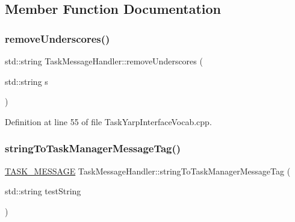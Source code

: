 \subsection{Member Function Documentation}
\hypertarget{classocra_1_1TaskMessageHandler_a688cdf189678986d158a1bc72ed84d2c}{}\label{classocra_1_1TaskMessageHandler_a688cdf189678986d158a1bc72ed84d2c} 
\subsubsection{\texorpdfstring{remove\+Underscores()}{removeUnderscores()}}
{\footnotesize\ttfamily std\+::string Task\+Message\+Handler\+::remove\+Underscores (\begin{DoxyParamCaption}\item[{std\+::string}]{s }\end{DoxyParamCaption})\hspace{0.3cm}{\ttfamily [static]}}



Definition at line 55 of file Task\+Yarp\+Interface\+Vocab.\+cpp.

\hypertarget{classocra_1_1TaskMessageHandler_a3f7195e7ad813c5da3ed175fd4e019a7}{}\label{classocra_1_1TaskMessageHandler_a3f7195e7ad813c5da3ed175fd4e019a7} 
\subsubsection{\texorpdfstring{string\+To\+Task\+Manager\+Message\+Tag()}{stringToTaskManagerMessageTag()}}
{\footnotesize\ttfamily \hyperlink{namespaceocra_ae51761f3980546f5ee4cbc6ebe4216dd}{T\+A\+S\+K\+\_\+\+M\+E\+S\+S\+A\+GE} Task\+Message\+Handler\+::string\+To\+Task\+Manager\+Message\+Tag (\begin{DoxyParamCaption}\item[{std\+::string}]{test\+String }\end{DoxyParamCaption})\hspace{0.3cm}{\ttfamily [static]}}



